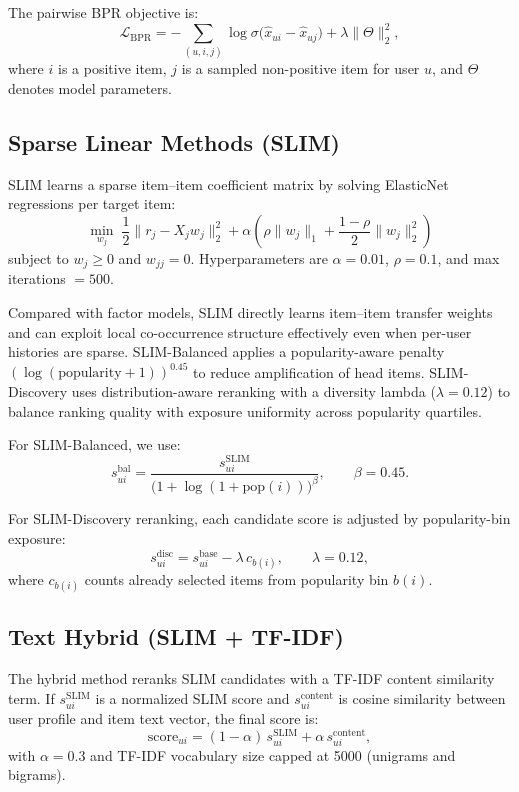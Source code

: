 \documentclass[sigconf,nonacm]{acmart}
\begin{document}
The pairwise BPR objective is:
\begin{equation}
\mathcal{L}_{\text{BPR}} =
-\sum_{(u,i,j)} \log \sigma\big(\hat{x}_{ui} - \hat{x}_{uj}\big)
+ \lambda \|\Theta\|_2^2,
\end{equation}
where $i$ is a positive item, $j$ is a sampled non-positive item for user $u$, and $\Theta$ denotes model parameters.

\subsection{Sparse Linear Methods (SLIM)}
SLIM learns a sparse item--item coefficient matrix by solving ElasticNet regressions per target item:
\begin{equation}
\min_{w_j}\;
\frac{1}{2}\lVert r_j - X_j w_j\rVert_2^2
+ \alpha\left(\rho\lVert w_j\rVert_1
+ \frac{1-\rho}{2}\lVert w_j\rVert_2^2\right)
\end{equation}
subject to $w_j \ge 0$ and $w_{jj}=0$. Hyperparameters are $\alpha=0.01$, $\rho=0.1$, and max iterations $=500$.

Compared with factor models, SLIM directly learns item--item transfer weights and can exploit local co-occurrence structure effectively even when per-user histories are sparse. SLIM-Balanced applies a popularity-aware penalty $(\log(\text{popularity}+1))^{0.45}$ to reduce amplification of head items. SLIM-Discovery uses distribution-aware reranking with a diversity lambda ($\lambda=0.12$) to balance ranking quality with exposure uniformity across popularity quartiles.

For SLIM-Balanced, we use:
\begin{equation}
s^{\text{bal}}_{ui} =
\frac{s^{\text{SLIM}}_{ui}}{\big(1 + \log(1+\text{pop}(i))\big)^{\beta}},
\qquad \beta = 0.45.
\end{equation}

For SLIM-Discovery reranking, each candidate score is adjusted by popularity-bin exposure:
\begin{equation}
s^{\text{disc}}_{ui} = s^{\text{base}}_{ui} - \lambda\,c_{b(i)},
\qquad \lambda = 0.12,
\end{equation}
where $c_{b(i)}$ counts already selected items from popularity bin $b(i)$.

\subsection{Text Hybrid (SLIM + TF-IDF)}
The hybrid method reranks SLIM candidates with a TF-IDF content similarity term. If $s^{\mathrm{SLIM}}_{ui}$ is a normalized SLIM score and $s^{\mathrm{content}}_{ui}$ is cosine similarity between user profile and item text vector, the final score is:
\begin{equation}
\mathrm{score}_{ui} = (1-\alpha)\,s^{\mathrm{SLIM}}_{ui} + \alpha\,s^{\mathrm{content}}_{ui},
\end{equation}
with $\alpha=0.3$ and TF-IDF vocabulary size capped at 5000 (unigrams and bigrams).
\end{document}
